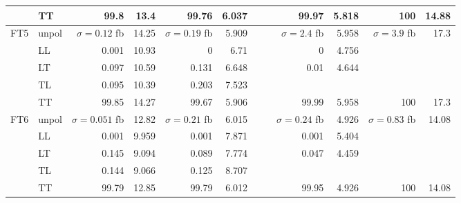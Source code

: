 \begin{table}[H]
{\begin{tabular}{llrrrrrrrrrr}
 & TT & \num{99.8} & \num{13.4} & \num{99.76} & \num{6.037} &  &  & \num{99.97} & \num{5.818} & \num{100} & \num{14.88} \\
\midrule
\multirow{5}{*}{FT5}
 & unpol & $\sigma = \num{0.12}$ fb & \num{14.25} & $\sigma = \num{0.19}$ fb & \num{5.909} &  &  & $\sigma = \num{2.4}$ fb & \num{5.958} & $\sigma = \num{3.9}$ fb & \num{17.3} \\
 & LL & \num{0.001} & \num{10.93} & \num{0} & \num{6.71} &  &  & \num{0} & \num{4.756} &  &  \\
 & LT & \num{0.097} & \num{10.59} & \num{0.131} & \num{6.648} &  &  & \num{0.01} & \num{4.644} &  &  \\
 & TL & \num{0.095} & \num{10.39} & \num{0.203} & \num{7.523} &  &  &  &  &  &  \\
 & TT & \num{99.85} & \num{14.27} & \num{99.67} & \num{5.906} &  &  & \num{99.99} & \num{5.958} & \num{100} & \num{17.3} \\
\midrule
\multirow{5}{*}{FT6}
 & unpol & $\sigma = \num{0.051}$ fb & \num{12.82} & $\sigma = \num{0.21}$ fb & \num{6.015} &  &  & $\sigma = \num{0.24}$ fb & \num{4.926} & $\sigma = \num{0.83}$ fb & \num{14.08} \\
 & LL & \num{0.001} & \num{9.959} & \num{0.001} & \num{7.871} &  &  & \num{0.001} & \num{5.404} &  &  \\
 & LT & \num{0.145} & \num{9.094} & \num{0.089} & \num{7.774} &  &  & \num{0.047} & \num{4.459} &  &  \\
 & TL & \num{0.144} & \num{9.066} & \num{0.125} & \num{8.707} &  &  &  &  &  &  \\
 & TT & \num{99.79} & \num{12.85} & \num{99.79} & \num{6.012} &  &  & \num{99.95} & \num{4.926} & \num{100} & \num{14.08} \\
\bottomrule
\end{tabular}
}%
\end{table}